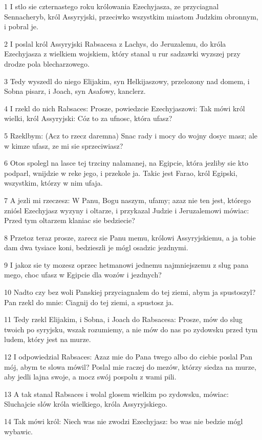 \par 1 I stlo sie czternastego roku królowania Ezechyjasza, ze przyciagnal Sennacheryb, król Assyryjski, przeciwko wszystkim miastom Judzkim obronnym, i pobral je.
\par 2 I poslal król Assyryjski Rabsacesa z Lachys, do Jeruzalemu, do króla Ezechyjasza z wielkiem wojskiem, który stanal u rur sadzawki wyzszej przy drodze pola blecharzowego.
\par 3 Tedy wyszedl do niego Elijakim, syn Helkijaszowy, przelozony nad domem, i Sobna pisarz, i Joach, syn Asafowy, kanclerz.
\par 4 I rzekl do nich Rabsaces: Prosze, powiedzcie Ezechyjaszowi: Tak mówi król wielki, król Assyryjski: Cóz to za ufnosc, która ufasz?
\par 5 Rzeklbym: (Acz to rzecz daremna) Snac rady i mocy do wojny dosyc masz; ale w kimze ufasz, ze mi sie sprzeciwiasz?
\par 6 Otos spolegl na lasce tej trzciny nalamanej, na Egipcie, która jezliby sie kto podparl, wnijdzie w reke jego, i przekole ja. Takic jest Farao, król Egipski, wszystkim, którzy w nim ufaja.
\par 7 A jezli mi rzeczesz: W Panu, Bogu naszym, ufamy; azaz nie ten jest, którego zniósl Ezechyjasz wyzyny i oltarze, i przykazal Judzie i Jeruzalemowi mówiac: Przed tym oltarzem klaniac sie bedziecie?
\par 8 Przetoz teraz prosze, zarecz sie Panu memu, królowi Assyryjskiemu, a ja tobie dam dwa tysiace koni, bedzieszli je mógl osadzic jezdnymi.
\par 9 I jakoz sie ty mozesz oprzec hetmanowi jednemu najmniejszemu z slug pana mego, choc ufasz w Egipcie dla wozów i jezdnych?
\par 10 Nadto czy bez woli Panskiej przyciagnalem do tej ziemi, abym ja spustoszyl? Pan rzekl do mnie: Ciagnij do tej ziemi, a spustosz ja.
\par 11 Tedy rzekl Elijakim, i Sobna, i Joach do Rabsacesa: Prosze, mów do slug twoich po syryjsku, wszak rozumiemy, a nie mów do nas po zydowsku przed tym ludem, który jest na murze.
\par 12 I odpowiedzial Rabsaces: Azaz mie do Pana twego albo do ciebie poslal Pan mój, abym te slowa mówil? Poslal mie raczej do mezów, którzy siedza na murze, aby jedli lajna swoje, a mocz swój pospolu z wami pili.
\par 13 A tak stanal Rabsaces i wolal glosem wielkim po zydowsku, mówiac: Sluchajcie slów króla wielkiego, króla Assyryjskiego.
\par 14 Tak mówi król: Niech was nie zwodzi Ezechyjasz: bo was nie bedzie mógl wybawic.
